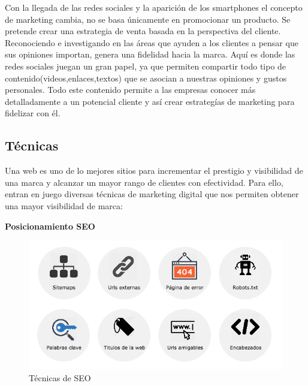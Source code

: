 \vspace{5 mm}


Con la llegada de las redes sociales y la aparición de los smartphones el concepto de marketing cambia, no se basa únicamente en promocionar un producto. Se pretende crear una estrategia de venta basada en la perspectiva del cliente. Reconociendo e investigando en las áreas que ayuden a los clientes a pensar que sus opiniones importan, genera una fidelidad hacia la marca. Aquí es donde las redes sociales juegan un gran papel, ya que permiten compartir todo tipo de contenido(videos,enlaces,textos) que se asocian a nuestras opiniones y gustos personales. Todo este contenido permite a las empresas conocer más detalladamente a un potencial cliente y así crear estrategías de marketing para fidelizar con él.


\subsection{Técnicas}

Una web es uno de lo mejores sitios para incrementar el prestigio y visibilidad de una marca y alcanzar un mayor rango de clientes con efectividad. Para ello, entran en juego diversas técnicas de marketing digital que nos permiten obtener una mayor visibilidad de marca:

\vspace{5 mm}

\textbf{Posicionamiento SEO}

\vspace{5 mm}

\begin{figure}
\begin{center}
\includegraphics[width=1.0\textwidth]{imagenes/SEO.png}
\caption{Técnicas de SEO}
\label{SEO}
\end{center}
\end{figure}

